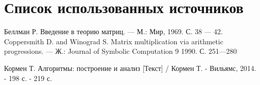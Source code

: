 \chapter*{Список использованных источников}

\begin{enumerate}[label = {[\arabic*]}]
	 Беллман Р. Введение в теорию матриц. — М.: Мир, 1969. С. 38 — 42.
	 Coppersmith D. and Winograd S. Matrix multiplication via arithmetic progressions. — Ж.: Journal of Symbolic Computation 9 1990. С. 251—280
	\item Кормен Т. Алгоритмы: построение и анализ [Текст] / Кормен Т. - Вильямс, 2014. - 198 с. - 219 с.
	
\end{enumerate}
